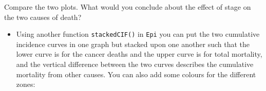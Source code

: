 \documentclass[
]{book}
\newenvironment{Shaded}{\begin{snugshade}}{\end{snugshade}}
\newcommand{\AttributeTok}[1]{\textcolor[rgb]{0.13,0.29,0.53}{#1}}
\newcommand{\DecValTok}[1]{\textcolor[rgb]{0.00,0.00,0.81}{#1}}
\newcommand{\FloatTok}[1]{\textcolor[rgb]{0.00,0.00,0.81}{#1}}
\newcommand{\FunctionTok}[1]{\textcolor[rgb]{0.13,0.29,0.53}{\textbf{#1}}}
\newcommand{\NormalTok}[1]{#1}
\newcommand{\SpecialCharTok}[1]{\textcolor[rgb]{0.81,0.36,0.00}{\textbf{#1}}}
\newcommand{\StringTok}[1]{\textcolor[rgb]{0.31,0.60,0.02}{#1}}
\providecommand{\tightlist}{%
  \setlength{\itemsep}{0pt}\setlength{\parskip}{0pt}}
\begin{document}
\begin{Shaded}
\end{Shaded}

Compare the two plots. What would you conclude about the effect of stage
on the two causes of death?

\begin{itemize}
\tightlist
\item
  Using another function \texttt{stackedCIF()} in \texttt{Epi} you can put the two
  cumulative incidence curves in one graph but stacked upon one another
  such that the lower curve is for the cancer deaths and the upper curve
  is for total mortality, and the vertical difference between the two
  curves describes the cumulative mortality from other causes. You can
  also add some colours for the different zones:
\end{itemize}
\end{document}
